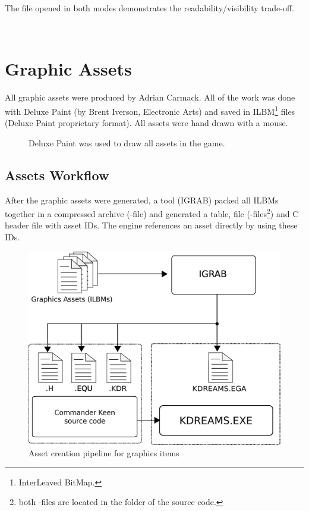 \documentclass[book.tex]{subfiles}
\begin{document}
\bigskip
 The file  opened in both modes demonstrates the readability/visibility trade-off.\\
\par

  \\
\vspace{-5pt}  
\par
\vspace{5pt}
\section{Graphic Assets}
\label{section:graphic_assets}

All graphic assets were produced by Adrian Carmack. All of the work was done with Deluxe Paint (by Brent Iverson, Electronic Arts) and saved in ILBM\footnote{InterLeaved BitMap.} files (Deluxe Paint proprietary format). All assets were hand drawn with a mouse.

\begin{figure}[H]
  \centering
 \caption{Deluxe Paint was used to draw all assets in the game.}
\end{figure}

\pagebreak

\subsection{Assets Workflow}
After the graphic assets were generated, a tool (IGRAB) packed all ILBMs together in a compressed  archive (-file) and generated a  table,  file (-files\footnote{both -files are located in the  folder of the source code.}) and C header file with asset IDs. The engine references an asset directly by using these IDs.\\

\begin{figure}[H]
\centering
 \includegraphics[width=.9\textwidth]{imgs/drawings/drawing_plain.eps}
 \caption{Asset creation pipeline for graphics items}
 \label{asset-creation-pipeline}
\end{figure}
\end{document}
